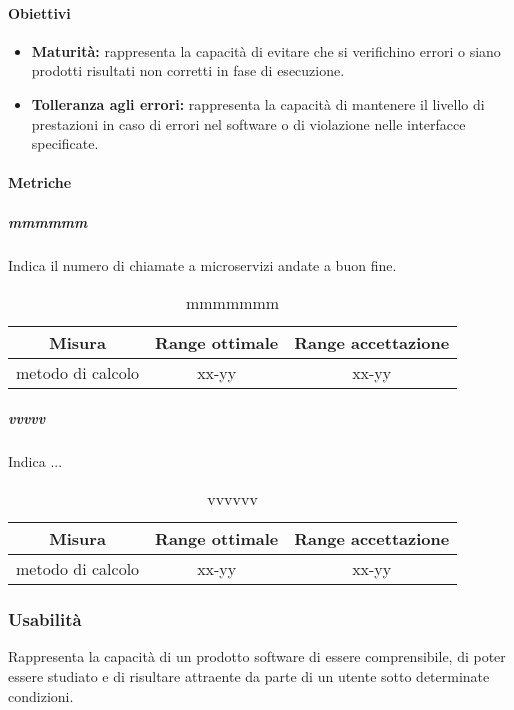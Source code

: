 		\paragraph{Obiettivi}
			\begin{itemize}
				\item \textbf{Maturità:} rappresenta la capacità di evitare che si verifichino errori o siano prodotti risultati non corretti in fase di esecuzione.
				\item \textbf{Tolleranza agli errori:} rappresenta la capacità di mantenere il livello di prestazioni in caso di errori nel software o di violazione nelle interfacce specificate.
			\end{itemize}
		
		\paragraph{Metriche}
			\subparagraph{mmmmmm}
			Indica il numero di chiamate a microservizi andate a buon fine.
			\begin{table}[H]
				\begin{center}
					\begin{tabular}{|c|c|c|}
						\hline
						\textbf{Misura} & \textbf{Range ottimale} & \textbf{Range accettazione} \\
						\hline
						metodo di calcolo & xx-yy  & xx-yy \\
						\hline
					\end{tabular}
				\end{center}
				\caption{mmmmmmm}
			\end{table}
		
			\subparagraph{vvvvv}
			Indica ...
			\begin{table}[H]
				\begin{center}
					\begin{tabular}{|c|c|c|}
						\hline
						\textbf{Misura} & \textbf{Range ottimale} & \textbf{Range accettazione} \\
						\hline
						metodo di calcolo & xx-yy  & xx-yy \\
						\hline
					\end{tabular}
				\end{center}
				\caption{vvvvvv}
			\end{table}
	
	\subsubsection{Usabilità}
	Rappresenta la capacità di un prodotto software di essere comprensibile, di poter essere studiato e di risultare attraente da parte di un utente sotto determinate condizioni.
	
